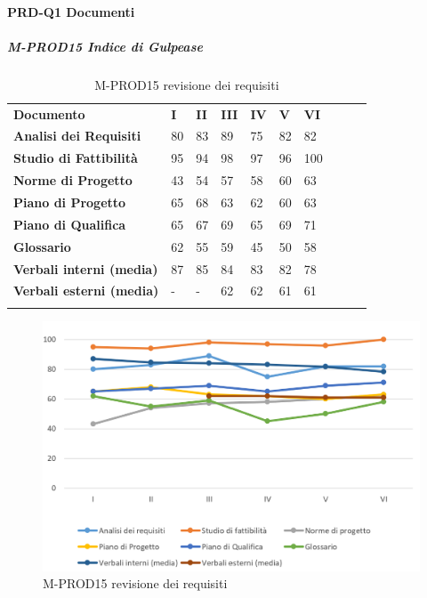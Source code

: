 \paragraph*{PRD-Q1 Documenti}
\subparagraph*{M-PROD15 Indice di Gulpease}\mbox{} %
\begin{longtable} {						
		>{}p{50mm}  		
		>{}p{8mm}		
		>{}p{8mm}		
		>{}p{8mm}		
		>{}p{8mm}		
		>{}p{8mm}		
		>{}p{8mm}
		>{}p{8mm}
		>{}p{8mm}
		>{}p{8mm}				
	}			
	\rowcolor{gray!50}
	\textbf{Documento} & \textbf{I} & \textbf{II} & \textbf{III} & \textbf{IV} & \textbf{V} & \textbf{VI} \TBstrut \\ [2mm]
	\textbf{Analisi dei Requisiti} & 80 & 83 & 89 & 75 & 82 & 82 \TBstrut \\ [2mm]
	\textbf{Studio di Fattibilità} & 95 & 94 & 98 & 97 & 96 & 100 \TBstrut \\ [2mm]
	\textbf{Norme di Progetto} & 43 & 54 & 57 & 58 & 60 & 63 \TBstrut \\ [2mm]
	\textbf{Piano di Progetto} & 65 & 68 & 63 & 62 & 60 & 63 \TBstrut \\ [2mm]
	\textbf{Piano di Qualifica} & 65 & 67 & 69 & 65 & 69 & 71 \TBstrut \\ [2mm]
	\textbf{Glossario} & 62 & 55 & 59 & 45 & 50 & 58 \TBstrut \\ [2mm]
	\textbf{Verbali interni (media)} & 87 & 85 & 84 & 83 & 82 & 78 \TBstrut \\ [2mm]
	\textbf{Verbali esterni (media)} & - & - & 62 & 62 & 61 & 61 \TBstrut \\ [2mm]
	\rowcolor{white}
	\caption{M-PROD15 revisione dei requisiti}
\end{longtable}
\begin{figure}[H] 	
	\includegraphics[width=\linewidth]{./img/grafici/2.png}	
	\caption{M-PROD15 revisione dei requisiti}	
\end{figure}
